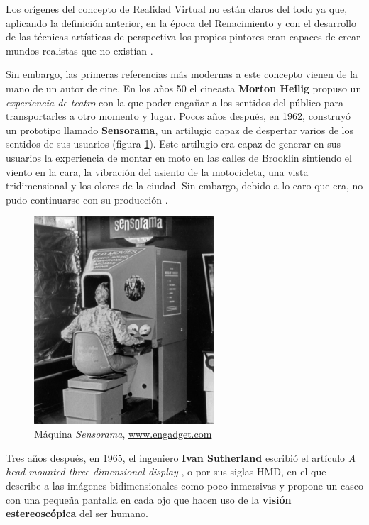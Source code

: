 Los orígenes del concepto de Realidad Virtual no están claros del todo ya que, aplicando la definición anterior, en la época del Renacimiento y con el desarrollo de las técnicas artísticas de perspectiva los propios pintores eran capaces de crear mundos realistas que no existían \cite{schn-17}. 

Sin embargo, las primeras referencias más modernas a este concepto vienen de la mano de un autor de cine. En los años 50 el cineasta \textbf{Morton Heilig} propuso un \textit{experiencia de teatro} con la que poder engañar a los sentidos del  público para transportarles a otro momento y lugar. Pocos años después, en 1962, construyó un prototipo llamado \textbf{Sensorama}, un artilugio capaz de despertar varios de los sentidos de sus usuarios (figura \ref{fig:sensorama}). Este artilugio era capaz de generar en sus usuarios la experiencia de montar en moto en las calles de Brooklin sintiendo el viento en la cara, la vibración del asiento de la motocicleta, una vista tridimensional y los olores de la ciudad. Sin embargo, debido a lo caro que era, no pudo continuarse con su producción \cite{brock-16}.

\vspace{0.2cm}

\begin{figure}[!h]
    \begin{center}
        \includegraphics[width=0.6\textwidth]{imagenes/2/sensorama.jpg}
        \caption{Máquina \textit{Sensorama}, \url{www.engadget.com}}
        \label{fig:sensorama}
    \end{center}
\end{figure}

Tres años después, en 1965, el ingeniero \textbf{Ivan Sutherland} escribió el artículo \textit{A head-mounted three dimensional display} \cite{suth-65}, o por sus siglas \acs{HMD}, en el que describe a las imágenes bidimensionales como poco inmersivas y propone un casco con una pequeña pantalla en cada ojo que hacen uso de la \textbf{visión estereoscópica} del ser humano.

